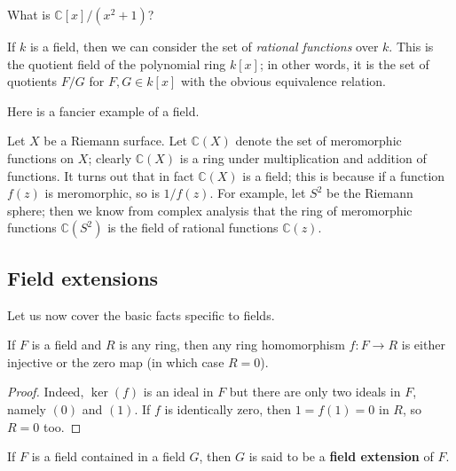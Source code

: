 \begin{exercise} 
What is $\mathbb{C}[x]/(x^2 + 1)$?
\end{exercise} 


\begin{example} 
If $k$ is a field, then we can consider the set of \emph{rational functions}
over $k$. This is the quotient field of the polynomial ring $k[x]$; in other
words, it is the set of quotients $F/G$ for $F, G \in k[x]$ with the obvious
equivalence relation.
\end{example} 


Here is a fancier example of a field.
\begin{example} 
\label{meromorphicfn}
Let $X$ be a Riemann surface. Let $\mathbb{C}(X)$ denote the
set of meromorphic functions on $X$; clearly $\mathbb{C}(X)$ is a ring under
multiplication and addition of functions. It turns out that in fact
$\mathbb{C}(X)$ is a
field; this is because if a function $f(z)$ is meromorphic, so is $1/f(z)$. For example,
let $S^2$ be the Riemann sphere; then we know from complex
analysis that the ring of meromorphic functions $\mathbb{C}(S^2)$ is the
field of rational functions $\mathbb{C}(z)$. 
\end{example}


\subsection{Field extensions}

Let us now cover the basic facts specific to fields.

\begin{proposition} \label{fieldinj} If $F$ is a field and $R$ is any ring, then any ring homomorphism $f:F\rightarrow
R$ is either injective or the zero map (in which case $R=0$).
\end{proposition}

\begin{proof} Indeed, $\ker(f)$ is an ideal in
$F$ but there are only two ideals in $F$, namely $(0)$ and $(1)$. If $f$ is identically
zero, then $1=f(1)=0$ in $R$, so $R=0$ too.
\end{proof}

\begin{definition} If $F$ is a field contained in a field $G$, then $G$ is said
to be a \textbf{field extension} of $F$.
\end{definition}

